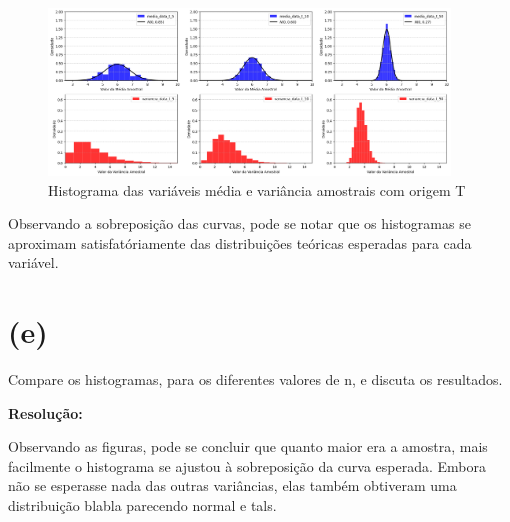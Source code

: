 \documentclass[]{abntex2}
\begin{document}
\begin{figure}
    \centering 
    \includegraphics[width=0.95\textwidth]{imgs/medvarT.png}
    \caption{Histograma das variáveis média e variância amostrais com origem T}
    \label{fig:medvarT} %
\end{figure}

Observando a sobreposição das curvas, pode se notar que os histogramas se aproximam satisfatóriamente das distribuições teóricas esperadas para cada variável.

\section*{\textbf{(e)}}

\noindent Compare os histogramas, para os diferentes valores de n, e discuta os resultados.

\textbf{Resolução:}

Observando as figuras, pode se concluir que quanto maior era a amostra, mais facilmente o histograma se ajustou à sobreposição da curva esperada. Embora não se esperasse nada das outras variâncias, elas também obtiveram uma distribuição blabla parecendo normal e tals.

\postextual


\end{document}
